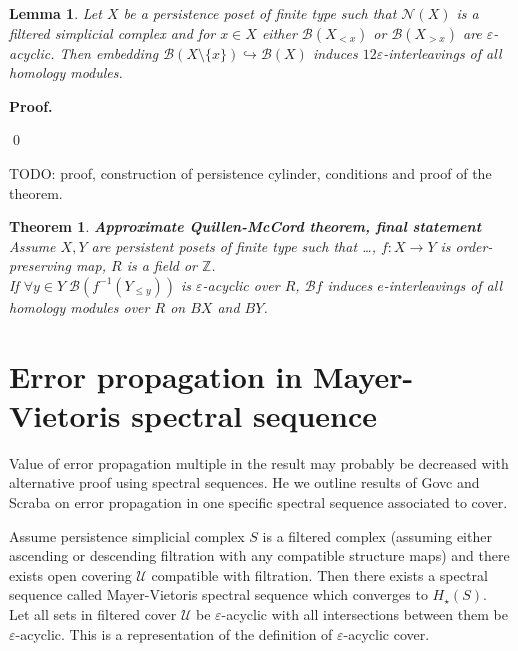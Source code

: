 \documentclass[a4paper, 12pt]{article}
\newtheorem{lemma}{Lemma}
\newtheorem{theorem}{Theorem}
\theoremstyle{definition}
\theoremstyle{remark}
\newenvironment{pf}{\noindent\textbf{Proof.}}{\qed}
\begin{document}
\begin{lemma}
  Let $X$ be a persistence poset of finite type such that $\mathcal{N}(X)$ is a filtered simplicial complex and for $x \in X$ either $\mathcal{B}(X_{< x})$ or $\mathcal{B}(X_{> x})$ are $\varepsilon$-acyclic. Then embedding $\mathcal{B}(X \setminus \{x\}) \hookrightarrow \mathcal{B}(X)$ induces $12\varepsilon$-interleavings of all homology modules.
\end{lemma}

\begin{pf}

\end{pf}

TODO: proof, construction of persistence cylinder, conditions and proof of the theorem.\\

\begin{theorem} \textbf{Approximate Quillen-McCord theorem, final statement}\\
  Assume $X, Y$ are persistent posets of finite type such that \ldots, $f : X \to Y$ is order-preserving map, $R$ is a field or $\mathbb{Z}$.\\
  If $\forall y \in Y\;\mathcal{B}(f^{-1}(Y_{\leqslant y}))$ is $\varepsilon$-acyclic over $R$, $\mathcal{B}f$ induces $e$-interleavings of all homology modules over $R$ on $BX$ and $BY$.\\
\end{theorem}

\section{Error propagation in Mayer-Vietoris spectral sequence}

Value of error propagation multiple in the result may probably be decreased with alternative proof using spectral sequences. He we outline results of Govc and Scraba on error propagation in one specific spectral sequence associated to cover.

Assume persistence simplicial complex $S$ is a filtered complex (assuming either ascending or descending filtration with any compatible structure maps) and there exists open covering $\mathcal{U}$ compatible with filtration. Then there exists a spectral sequence called Mayer-Vietoris spectral sequence which converges to $H_{\star}(S)$. {\cite[Theorem 2.30]{GS16}}\\

Let all sets in filtered cover $\mathcal{U}$ be $\varepsilon$-acyclic with all intersections between them be $\varepsilon$-acyclic. This is a representation of the definition of $\varepsilon$-acyclic cover. {\cite[Definition 3.2]{GS16}}\\
\end{document}
